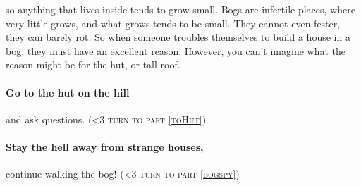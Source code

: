 \documentclass[10pt,twoside]{book}
\newcommand*\goTo[1]{({\scshape\ifnum\value{list}<3 turn to \fi part \vref{#1}})}
\begin{document}
so anything that lives inside tends to grow small.
Bogs are infertile places, where very little grows, and what grows tends to be small.
They cannot even fester, they can barely rot.
So when someone troubles themselves to build a house in a bog, they must have an excellent reason.
However, you can't imagine what the reason might be for the hut, or tall roof.

\paragraph{Go to the hut on the hill}
and ask questions.
\goTo{toHut}

\paragraph{Stay the hell away from strange houses,}
continue walking the bog!
\goTo{bogspy}
\end{document}
